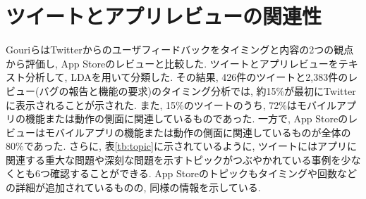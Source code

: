 


\section{ツイートとアプリレビューの関連性}
Gouriら\cite{tweetapp}はTwitterからのユーザフィードバックをタイミングと内容の2つの観点から評価し, App Storeのレビューと比較した. 
ツイートとアプリレビューをテキスト分析して, LDAを用いて分類した. その結果, 426件のツイートと2,383件のレビュー(バグの報告と機能の要求)のタイミング分析では, 約15\%が最初にTwitterに表示されることが示された. 
また, 15\%のツイートのうち, 72\%はモバイルアプリの機能または動作の側面に関連しているものであった. 一方で, App Storeのレビューはモバイルアプリの機能または動作の側面に関連しているものが全体の80\%であった. 
さらに, 表\ref{tb:topic}に示されているように, ツイートにはアプリに関連する重大な問題や深刻な問題を示すトピックがつぶやかれている事例を少なくとも6つ確認することができる. App Storeのトピックもタイミングや回数などの詳細が追加されているものの, 同様の情報を示している. 

